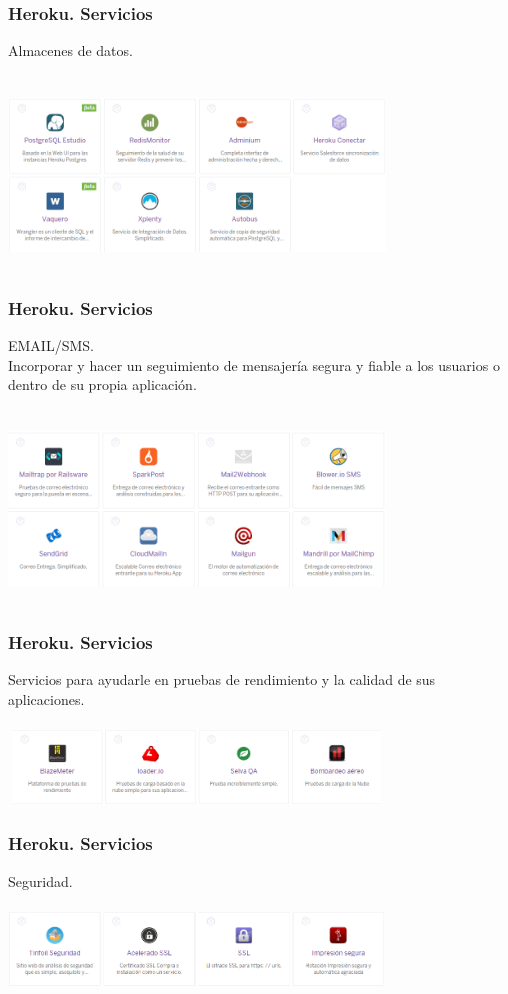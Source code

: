 \documentclass{beamer}
\begin{document}
\begin{frame}
\frametitle{Heroku. Servicios}
Almacenes de datos.\\ \ \\
\includegraphics[width=10cm, height=5cm]{ampliacion/3.png}
\end{frame}

\begin{frame}
\frametitle{Heroku. Servicios}
EMAIL/SMS.\\
Incorporar y hacer un seguimiento de mensajería segura y fiable a los usuarios o dentro de su propia aplicación.\\ \ \\
\includegraphics[width=10cm, height=5cm]{ampliacion/4.png}
\end{frame}

\begin{frame}
\frametitle{Heroku. Servicios}
Servicios para ayudarle en pruebas de rendimiento y la calidad de sus aplicaciones.\\ \ \\
\includegraphics[width=10cm, height=2cm]{ampliacion/5.png}
\end{frame}

\begin{frame}
\frametitle{Heroku. Servicios}
Seguridad.\\ \ \\
\includegraphics[width=10cm, height=2cm]{ampliacion/6.png}
\end{frame}
\end{document}
